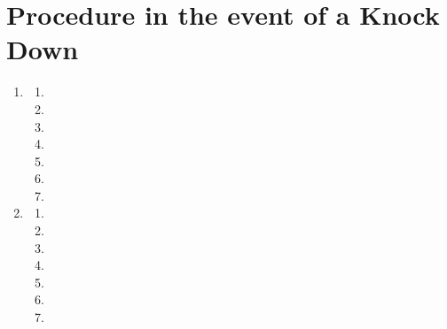 \documentclass[draft]{report}
\begin{document}
\chapter{Procedure in the event of a Knock Down}\label{knock-down-proc}

\begin{enumerate}
\item

    \begin{enumerate}
    \item
    
    \item
    
    \item
    
    \item
    
    \item
    
    \item
    
    \item
    
    \end{enumerate}
\item

    \begin{enumerate}
    \item
    
    \item
    
    \item
    
    \item
    
    \item
    
    \item
    
    \item
    
    \end{enumerate}
\end{enumerate}
\end{document}
